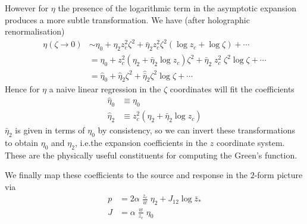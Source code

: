 \documentclass[aps,preprint,nofootinbib,preprintnumbers,eqsecnum,superscriptaddress]{revtex4}
\begin{document}
\begin{appendix}
However for $\eta$ the presence of the logarithmic term in the asymptotic expansion produces a more subtle transformation. We have (after holographic renormalisation)
\begin{align}
	\eta(\zeta \to 0)
	& \sim \eta_0 + \eta_{2} z_c^2 \zeta^2  + \bar{\eta}_2 z_c^2 \zeta^2 (\log z_c + \log \zeta) + \cdots	\\ \nonumber
	& = \eta_0 + z_c^2 \left (\eta_2 + \bar{\eta}_2 \log z_c \right) \zeta^2  + \bar{\eta}_2 \; z_c^2 \; \zeta^2 \log \zeta + \cdots	\\ \nonumber
	& = \hat{\eta}_0 + \hat{\eta}_2 \zeta^2 + \hat{\bar{\eta}}_2 \zeta^2 \log \zeta + \cdots
\end{align}
Hence for $\eta$ a naive linear regression in the $\zeta$ coordinates will fit the coefficients
\begin{subequations}
	\begin{align}
		\hat{\eta}_0 & \equiv \eta_0		\\
		\hat{\eta}_2 & \equiv z_c^2 \left (\eta_2 + \bar{\eta}_2 \log z_c \right)
	\end{align}
\end{subequations}
$\bar{\eta}_2$ is given in terms of $\eta_0$ by consistency, so we can invert these transformations to obtain $\eta_0$ and $\eta_2$, i.e.the expansion coefficients in the $z$ coordinate system. These are the physically useful constituents for computing the Green's function.

We finally map these coefficients to the source and response in the $2$-form picture via
\begin{subequations}
	\begin{align}
		p & = 2\alpha \; \frac{z_c}{w} \; \eta_2 + J_{12} \log \bar{z}_*		\\
		J & = \alpha \; \frac{w}{z_c} \; \eta_0		
	\end{align}
\end{subequations}

\end{appendix}
\end{document}
